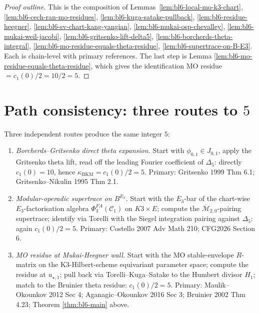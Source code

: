 \begin{proof}[Proof outline]
This is the composition of Lemmas~\ref{lem:bl6-local-mo-k3-chart},
\ref{lem:bl6-cech-ran-mo-residues},
\ref{lem:bl6-kuga-satake-pullback},
\ref{lem:bl6-residue-heegner},
\ref{lem:bl6-sv-chart-kang-yangian},
\ref{lem:bl6-mukai-osp-chevalley},
\ref{lem:bl6-mukai-weil-jacobi},
\ref{lem:bl6-gritsenko-lift-delta5},
\ref{lem:bl6-borcherds-theta-integral},
\ref{lem:bl6-mo-residue-equals-theta-residue},
\ref{lem:bl6-supertrace-on-B-E3}. Each is chain-level with primary
references. The last step is Lemma
\ref{lem:bl6-mo-residue-equals-theta-residue}, which gives the
identification MO residue $= c_{1}(0)/2 = 10/2 = 5$.
\end{proof}

\section*{Path consistency: three routes to $5$}

Three independent routes produce the same integer $5$:

\begin{enumerate}
\item[\textbf{Path 1}]
   \emph{Borcherds--Gritsenko direct theta expansion.}
   Start with $\phi_{0, 1} \in J_{0, 1}$, apply the Gritsenko
   theta lift, read off the leading Fourier coefficient of
   $\Delta_5$: directly $c_1(0) = 10$, hence
   $\kappa_{\mathrm{BKM}} = c_1(0)/2 = 5$.
   Primary: Gritsenko 1999 Thm 6.1; Gritsenko--Nikulin 1995 Thm
   2.1.

\item[\textbf{Path 2}]
   \emph{Modular-operadic supertrace on $B^{E_3}$.}
   Start with the $E_3$-bar of the chart-wise $E_3$-factorisation
   algebra $\Phi^{FA}_{3}(\mathcal C_{1})$ on $K3 \times E$;
   compute the $\overline{\mathcal M}_{2, 0}$-pairing supertrace;
   identify via Torelli with the Siegel integration pairing against
   $\Delta_5$: again $c_1(0)/2 = 5$.
   Primary: Costello 2007 Adv Math 210; CFG2026 Section 6.

\item[\textbf{Path 3}]
   \emph{MO residue at Mukai-Heegner wall.}
   Start with the MO stable-envelope $R$-matrix on the
   K3-Hilbert-scheme equivariant parameter space; compute the
   residue at $u_{\star, 1}$; pull back via Torelli--Kuga--Satake to
   the Humbert divisor $H_{1}$; match to the Bruinier theta
   residue: $c_1(0)/2 = 5$.
   Primary: Maulik--Okounkov 2012 Sec 4; Aganagic--Okounkov 2016
   Sec 3; Bruinier 2002 Thm 4.23; Theorem \ref{thm:bl6-main}
   above.
\end{enumerate}

